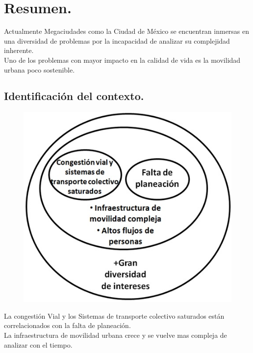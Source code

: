 \documentclass[10pt]{article}
\begin{document}
\tableofcontents 

\newpage

\section{Resumen.}
Actualmente Megaciudades como la Ciudad de México se encuentran inmersas en una diversidad de problemas por la incapacidad de analizar su complejidad inherente. \\

Uno de los problemas con mayor impacto en la calidad de vida es la movilidad urbana poco sostenible. 

\subsection{Identificación del contexto.}

\begin{figure}[htbp!]
	\begin{center}
		\includegraphics[scale = 0.8]{Imagen/Contexto.jpg}
	\end{center}
\end{figure}

La congestión Vial y los Sistemas de transporte colectivo saturados están correlacionados con la falta de planeación.\\

La infraestructura de movilidad urbana crece y se vuelve mas compleja de analizar con el tiempo.\\
\end{document}
